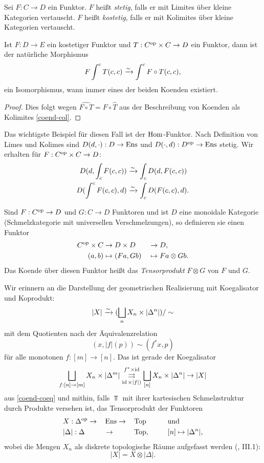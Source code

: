 \begin{defn}
  Sei $F: C \to D$ ein Funktor. $F$ heißt \emph{stetig}, falls er mit
  Limites über kleine Kategorien vertauscht. $F$ heißt
  \emph{kostetig}, falls er mit Kolimites über kleine Kategorien
  vertauscht.
\end{defn}
\begin{kor}
  \label{coend-cocont}
  Ist $F: D \to E$ ein kostetiger Funktor und $T: C^\mathrm{op} \times C \to D$
  ein Funktor, dann ist der natürliche Morphismus
  \[ F \int^c T(c, c) \xrightarrow[]{\sim} \int^c F \circ T(c, c), \]
  ein Isomorphismus, wann immer eines der beiden Koenden existiert.
\end{kor}
\begin{proof}
  Dies folgt wegen $\widehat{F \circ T} = F \circ \hat{T}$ aus der
  Beschreibung von Koenden als Kolimites \ref{coend-col}.
\end{proof}
\begin{bem}
  Das wichtigste Beispiel für diesen Fall ist der $\operatorname{Hom}$-Funktor. Nach
  Definition von Limes und Kolimes sind $D(d, \cdot): D \to \operatorname{Ens}$ und
  $D(\cdot, d): D^\mathrm{op} \to \operatorname{Ens}$ stetig. Wir erhalten für $F: C^\mathrm{op}
  \times C \to D$:
  \begin{align*}
    D(d, \int_c F(c, c)) & \xrightarrow[]{\sim} \int_c D(d, F(c, c)) \\
    D(\int^c F(c, c), d) &\xrightarrow[]{\sim} \int_c D(F(c, c), d).
  \end{align*}
\end{bem}

Sind $F: C^\mathrm{op} \to D$ und $G: C \to D$ Funktoren und ist $D$ eine
monoidale Kategorie (Schmelzkategorie mit universellen
Verschmelzungen), so definieren sie einen Funktor
\begin{alignat*}{4}
  C^\mathrm{op} \times C &\to D \times D &&\to D, \\
  (a, b) &\mapsto (Fa, Gb) &&\mapsto Fa \otimes Gb.
\end{alignat*}
Das Koende über diesen Funktor heißt das \emph{Tensorprodukt} $F
\otimes G$ von $F$ und $G$.

Wir erinnern an die Darstellung der geometrischen Realisierung mit
Koegalisator und Koprodukt:
\[ |X| \xrightarrow[]{\sim} (\bigsqcup_n X_n \times |\Delta^n|) / \sim \]
mit dem Quotienten nach der Äquivalenzrelation
\[ (x, |f|(p)) \sim (f^* x, p) \]
für alle monotonen $f: [m] \to [n]$. Das ist gerade der Koegalisator
 \[ \bigsqcup_{f: [n] \to [m]} X_n \times |\Delta^m|
 \overset{f^* \times \operatorname{id}}{\underset{\operatorname{id} \times |f|)}{\rightrightarrows}}
 \bigsqcup_{[n]} X_n \times |\Delta^n| \to |X| \]
aus \ref{coend-coeq} und mithin, falls $\Top$ mit ihrer kartesischen
Schmelzstruktur durch Produkte versehen ist, das Tensorprodukt der
Funktoren
\begin{alignat*}{4}
  &X: \Delta^\mathrm{op} \to &&\operatorname{Ens} \to &&\operatorname{Top} \qquad &&\text{und} \\
  &|\Delta|: \Delta &&\to &&\operatorname{Top}, && [n] \mapsto |\Delta^n|,
\end{alignat*}
wobei die Mengen $X_n$ als diskrete topologische Räume aufgefasst
werden (\cite{Moer}, III.1):
\[ |X| = X \otimes |\Delta|. \]

